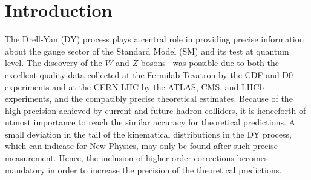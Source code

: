 \documentclass[a4paper]{jpconf}
\begin{document}
\newcommand\as{\alpha_{s}}


\newcommand{\be}{\begin{equation}}
\newcommand{\ee}{\end{equation}}
\newcommand{\bea}{\begin{eqnarray}}
\newcommand{\eea}{\end{eqnarray}}
\newcommand{\smallw}{{\scriptscriptstyle W}}
\newcommand{\mt}{m_t}
\newcommand{\ml}{m_\ell}
\newcommand{\mw}{\mu_\smallw}
\newcommand{\mwsq}{\mu_\smallw^2}
\newcommand{\mwc}{\mu_{\smallw 0}}
\newcommand{\smallz}{{\scriptscriptstyle Z}}
\newcommand{\mz}{\mu_\smallz}
\newcommand{\mzsq}{\mu_\smallz^2}
\newcommand{\mzc}{\mu_{\smallz 0}}
\newcommand{\cmz}{\bar{\mu}_{\smallz}}
\newcommand{\oa}{${\cal O}(\alpha)~$}
\newcommand{\oaa}{${\cal O}(\alpha^2)~$}
\newcommand{\oas}{${\cal O}(\alpha_s)~$}
\newcommand{\oaas}{${\cal O}(\alpha\alpha_s)~$}
\newcommand{\sineffl}{\sin\theta_{eff}^{\ell}\,}
\newcommand{\coseffl}{\cos\theta_{eff}^{\ell}\,}
\newcommand{\seffl}{\sin^2\theta_{eff}^{\ell}\,}
\newcommand{\ceffl}{\cos^2\theta_{eff}^{\ell}\,}
\newcommand{\sw}{s_\smallw\,}
\newcommand{\cw}{c_\smallw\,}
\newcommand{\swd}{s_\smallw^2\,}
\newcommand{\cwd}{c_\smallw^2\,}



\section{Introduction}
\label{sec:intro}


The Drell-Yan (DY) process \cite{Drell:1970wh} plays a central role in providing precise information 
about the gauge sector of the Standard Model (SM) and its test at quantum level.
The discovery of the $W$ and $Z$ bosons~\cite{Arnison:1983rp,Banner:1983jy,Arnison:1983mk,Bagnaia:1983zx}
was possible due to both the excellent quality data collected at the Fermilab Tevatron by the CDF and D0 experiments and at the CERN LHC by the ATLAS, CMS, and LHCb experiments, and the compatibly precise theoretical estimates. 
% 
Because of the high precision achieved by current and future hadron colliders, it is henceforth of utmost importance
to reach the similar accuracy for theoretical predictions.
% 
A small deviation in the tail of the kinematical distributions in the DY process,
which can indicate for New Physics,
may only be found after such precise measurement.
% 
Hence, the inclusion of higher-order corrections becomes mandatory in order to increase the precision of the theoretical predictions.
\end{document}
